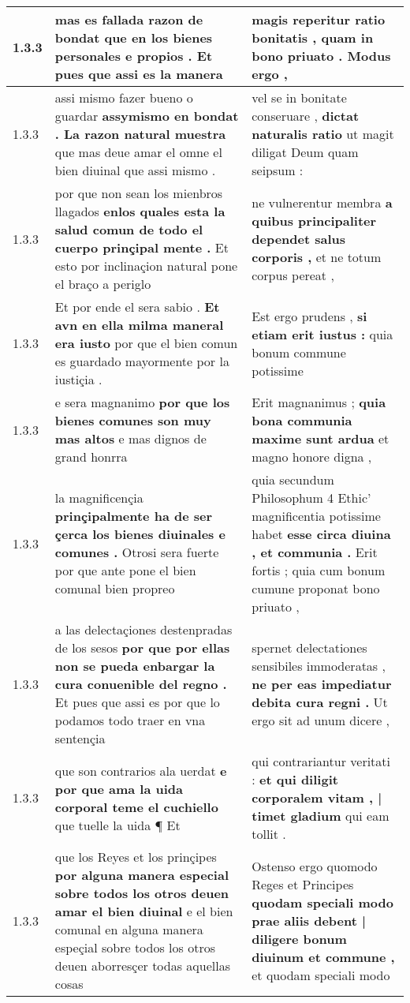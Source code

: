\begin{tabular}{|p{1cm}|p{6.5cm}|p{6.5cm}|}
1.3.3 & mas es fallada razon de bondat \textbf{ que en los bienes personales e propios . } Et pues que assi es la manera & magis reperitur ratio bonitatis , \textbf{ quam in bono priuato . } Modus ergo , \\\hline
1.3.3 & assi mismo fazer bueno o guardar \textbf{ assymismo en bondat . La razon natural muestra } que mas deue amar el omne el bien diuinal que assi mismo . & vel se in bonitate conseruare , \textbf{ dictat naturalis ratio } ut magit diligat Deum quam seipsum : \\\hline
1.3.3 & por que non sean los mienbros llagados \textbf{ enlos quales esta la salud comun de todo el cuerpo prinçipal mente . } Et esto por inclinaçion natural pone el braço a periglo & ne vulnerentur membra \textbf{ a quibus principaliter dependet salus corporis , } et ne totum corpus pereat , \\\hline
1.3.3 & Et por ende el sera sabio . \textbf{ Et avn en ella milma maneral era iusto } por que el bien comun es guardado mayormente por la iustiçia . & Est ergo prudens , \textbf{ si etiam erit iustus : } quia bonum commune potissime \\\hline
1.3.3 & e sera magnanimo \textbf{ por que los bienes comunes son muy mas altos } e mas dignos de grand honrra & Erit magnanimus ; \textbf{ quia bona communia maxime sunt ardua } et magno honore digna , \\\hline
1.3.3 & la magnificençia \textbf{ prinçipalmente ha de ser çerca los bienes diuinales e comunes . } Otrosi sera fuerte por que ante pone el bien comunal bien propreo & quia secundum Philosophum 4 Ethic’ magnificentia potissime habet \textbf{ esse circa diuina , et communia . } Erit fortis ; quia cum bonum cumune proponat bono priuato , \\\hline
1.3.3 & a las delectaçiones destenpradas de los sesos \textbf{ por que por ellas non se pueda enbargar la cura conuenible del regno . } Et pues que assi es por que lo podamos todo traer en vna sentençia & spernet delectationes sensibiles immoderatas , \textbf{ ne per eas impediatur debita cura regni . } Ut ergo sit ad unum dicere , \\\hline
1.3.3 & que son contrarios ala uerdat \textbf{ e por que ama la uida corporal teme el cuchiello } que tuelle la uida ¶ Et & qui contrariantur veritati : \textbf{ et qui diligit corporalem vitam , | timet gladium } qui eam tollit . \\\hline
1.3.3 & que los Reyes et los prinçipes \textbf{ por alguna manera especial sobre todos los otros deuen amar el bien diuinal } e el bien comunal en alguna manera espeçial sobre todos los otros deuen aborresçer todas aquellas cosas & Ostenso ergo quomodo Reges et Principes \textbf{ quodam speciali modo prae aliis debent | diligere bonum diuinum et commune , } et quodam speciali modo \\\hline

\end{tabular}
